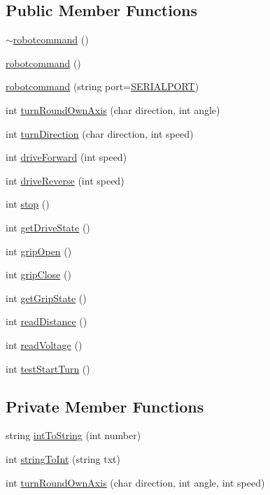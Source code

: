 \subsection*{Public Member Functions}
\begin{DoxyCompactItemize}
\item 
\hyperlink{classrobotcommand_aa9baff763183ccfc69757aca4e40dcd8}{$\sim$robotcommand} ()
\item 
\hyperlink{classrobotcommand_af19fa9cf0701a23ab114b69e756d1ab5}{robotcommand} ()
\item 
\hyperlink{classrobotcommand_a52e24824353237ed366fc010a2fe83f1}{robotcommand} (string port=\hyperlink{robotcommand_8h_acd526f11ce51532b8187f63bac77d87b}{S\-E\-R\-I\-A\-L\-P\-O\-R\-T})
\item 
int \hyperlink{classrobotcommand_a108981093dc6edff9aa95b28b2cc2333}{turn\-Round\-Own\-Axis} (char direction, int angle)
\item 
int \hyperlink{classrobotcommand_a0ef498eb5ba8f4b25c5623c435af6239}{turn\-Direction} (char direction, int speed)
\item 
int \hyperlink{classrobotcommand_a9ac4f18967d91b8e509767dc9f21cde7}{drive\-Forward} (int speed)
\item 
int \hyperlink{classrobotcommand_a460b1282f139510ac5347415a996d961}{drive\-Reverse} (int speed)
\item 
int \hyperlink{classrobotcommand_a32699ec2e45ef5e6aaaab39a51e27a63}{stop} ()
\item 
int \hyperlink{classrobotcommand_a4213a394de57c5c24a976cc3e8c1717a}{get\-Drive\-State} ()
\item 
int \hyperlink{classrobotcommand_af741cb165c3871d9d0503f56fa3c78b1}{grip\-Open} ()
\item 
int \hyperlink{classrobotcommand_a076218b7721984dacd431594dd03f420}{grip\-Close} ()
\item 
int \hyperlink{classrobotcommand_a69294589313aa0a1d7a03d9f3dc7656f}{get\-Grip\-State} ()
\item 
int \hyperlink{classrobotcommand_ad10998d94d1b7f378f0715b08b4efa2a}{read\-Distance} ()
\item 
int \hyperlink{classrobotcommand_a23fdf87741ce41a862dd0c9be64621a4}{read\-Voltage} ()
\item 
int \hyperlink{classrobotcommand_abe3d7070fde985f906c2f604d98ca1b2}{test\-Start\-Turn} ()
\end{DoxyCompactItemize}
\subsection*{Private Member Functions}
\begin{DoxyCompactItemize}
\item 
string \hyperlink{classrobotcommand_acedd5f9a9dc4a4a0965f46750eb8df33}{int\-To\-String} (int number)
\item 
int \hyperlink{classrobotcommand_a3bc304d1666269cc31f8ba929ba05d6d}{string\-To\-Int} (string txt)
\item 
int \hyperlink{classrobotcommand_ac254ab4292788bbf36667463dafd4c4c}{turn\-Round\-Own\-Axis} (char direction, int angle, int speed)
\end{DoxyCompactItemize}

